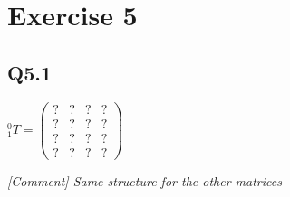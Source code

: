\section{Exercise 5} \label{P5}
\subsection{Q5.1}
$^0_1 T = \begin{pmatrix}
        ? & ? & ? & ? \\
        ? & ? & ? & ? \\
        ? & ? & ? & ? \\
        ? & ? & ? & ?
    \end{pmatrix}$
    
\textit{[Comment] Same structure for the other matrices } 
